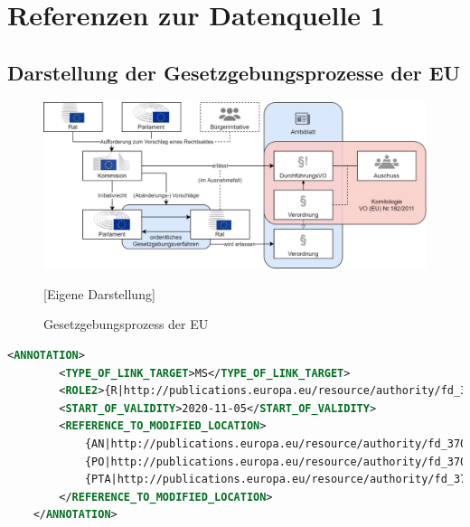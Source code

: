 
\chapter{Referenzen zur Datenquelle 1}
    
    \section{Darstellung der Gesetzgebungsprozesse der EU}
    
    \begin{figure}[H]
        \centering
        \includegraphics[width=\linewidth]{gfx/Gesegebungsprozess.png}
        \caption{Gesetzgebungsprozess der EU} 
        [Eigene Darstellung]
        \label{fig:europeg}
    \end{figure}

    


\begin{lstlisting}[language=XML]
    <ANNOTATION>
        <TYPE_OF_LINK_TARGET>MS</TYPE_OF_LINK_TARGET>
        <ROLE2>{R|http://publications.europa.eu/resource/authority/fd_375/R}<ROLE2>
        <START_OF_VALIDITY>2020-11-05</START_OF_VALIDITY>
        <REFERENCE_TO_MODIFIED_LOCATION>
            {AN|http://publications.europa.eu/resource/authority/fd_370/AN} V
            {PO|http://publications.europa.eu/resource/authority/fd_370/PO} MET
            {PTA|http://publications.europa.eu/resource/authority/fd_370/PTA} (c) PT 1
        </REFERENCE_TO_MODIFIED_LOCATION>
    </ANNOTATION>
\end{lstlisting}


